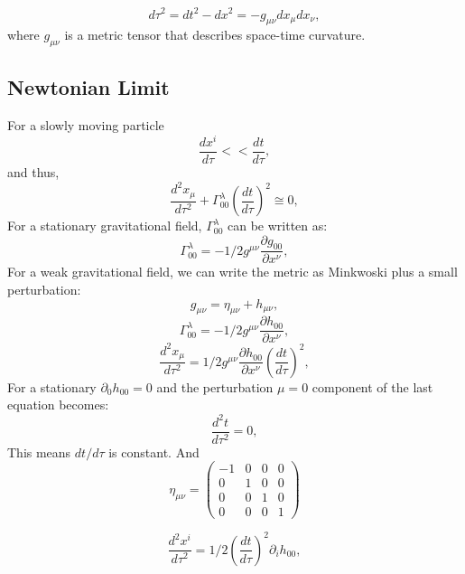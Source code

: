\documentclass{ttuthes2007}
\begin{document}
\begin{equation}
d\tau^2=dt^2 - dx^2 = -g_{\mu\nu}dx_\mu dx_\nu,
\end{equation}
where $g_{\mu\nu}$ is a metric tensor that describes space-time curvature.
\subsection{Newtonian Limit}
	For a slowly moving particle 
\begin{equation}
\frac{dx^i}{d\tau}<< \frac{dt}{d\tau},
\end{equation}
and thus,
\begin{equation}
\frac{d^2x_\mu}{d\tau^2}+\Gamma^\lambda_{00}\left(\frac{dt}{d\tau}\right)^2
\cong 0,
\end{equation}
For a stationary gravitational field, $\Gamma^\lambda_{00}$ can be written as:
\begin{equation}
\Gamma^\lambda_{00}= -1/2 g^{\mu \nu} \frac{\partial g_{00}}{\partial x^\nu},
\end{equation}	
For a weak gravitational field, we can write the metric as Minkwoski plus a small
perturbation:
\begin{equation}
g_{\mu \nu}= \eta_{\mu \nu} + h_{\mu \nu},
\end{equation}
\begin{equation}
\Gamma^\lambda_{00}= -1/2 g^{\mu \nu} \frac{\partial h_{00}}{\partial x^\nu},
\end{equation}	
\begin{equation}
\frac{d^2x_\mu}{d\tau^2}=1/2 g^{\mu \nu} \frac{\partial h_{00}}{\partial x^\nu}
\left(\frac{dt}{d\tau}\right)^2,
\end{equation}
For a stationary $\partial_0h_{00}=0$ and the perturbation $\mu=0$ component of
the last equation becomes:
\begin{equation}
\frac{d^2t}{d\tau^2}=0,
\end{equation}
This means $dt/d\tau$ is constant. And
\begin{equation*}
\eta_{\mu\nu}=
 \begin{pmatrix}
    -1 & 0 & 0 & 0 \\
    0 & 1 & 0 & 0 \\
    0 & 0 & 1 & 0 \\
    0 & 0 & 0 & 1 
 \end{pmatrix}
\end{equation*}

\begin{equation}                                                                
\frac{d^2x^i}{d\tau ^2}=1/2 \left(\frac{dt}{d\tau}\right)^2 \partial _i h_{00},
\end{equation} 
\end{document}
